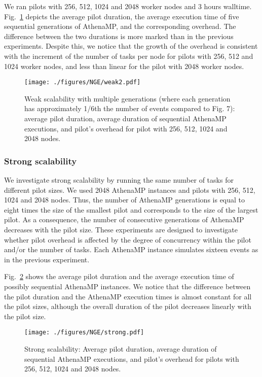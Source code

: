 We ran pilots with 256, 512, 1024 and 2048 worker nodes and 3
hours walltime. Fig.~\ref{fig:weakScal2a} depicts the average pilot duration,
the average execution time of five sequential generations of AthenaMP, and
the corresponding overhead. The difference between the two durations is more
marked than in the previous experiments. Despite this, we notice that the
growth of the overhead is consistent with the increment of the number of
tasks per node for pilots with 256, 512 and 1024 worker nodes, and less than
linear for the pilot with 2048 worker nodes.

\begin{figure}[!t]
    \texttt{[image: ./figures/NGE/weak2.pdf]}
    \vspace{-0.3in}
    \caption{Weak scalability with multiple generations (where each
    generation has approximately 1/6th the number of events compared to Fig.
    7): average pilot duration, average duration of sequential AthenaMP
    executions, and pilot's overhead for pilot with 256, 512, 1024 and 2048
    nodes.}\label{fig:weakScal2a}
\end{figure}


\subsubsection{Strong scalability}

We investigate strong scalability by running the same number of tasks for
different pilot sizes. We used 2048 AthenaMP instances and pilots with 256,
512, 1024 and 2048 nodes. Thus, the number of AthenaMP generations is equal
to eight times the size of the smallest pilot and corresponds to the size of
the largest pilot. As a consequence, the number of consecutive generations of
AthenaMP decreases with the pilot size. These experiments are designed to
investigate whether pilot overhead is affected by the degree of concurrency
within the pilot and/or the number of tasks. Each AthenaMP instance simulates
sixteen events as in the previous experiment.

Fig.~\ref{fig:strongScala} shows the average pilot duration and the average
execution time of possibly sequential AthenaMP instances. We notice that the
difference between the pilot duration and the AthenaMP execution times is
almost constant for all the pilot sizes, although the overall duration of the
pilot decreases linearly with the pilot size.

\begin{figure}[!t]
    \texttt{[image: ./figures/NGE/strong.pdf]}
    \vspace{-0.3in}
    \caption{Strong scalability: Average pilot duration, average duration of
    sequential AthenaMP executions, and pilot's overhead for pilots with 256,
    512, 1024 and 2048 nodes.}\label{fig:strongScala}
\end{figure}

\vspace{-0.05in}
